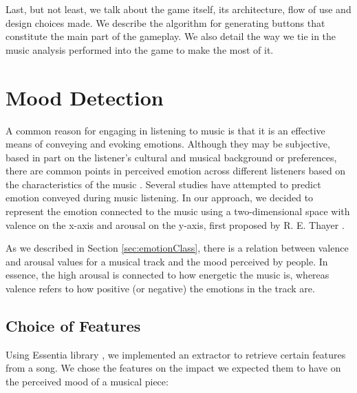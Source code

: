 Last, but not least, we talk about the game itself, its architecture, flow of use and design choices made. We describe the algorithm for generating buttons that constitute the main part of the gameplay. We also detail the way we tie in the music analysis performed into the game to make the most of it.

\vspace{20pt}

\section{Mood Detection}

A common reason for engaging in listening to music is that it is an effective means of conveying and evoking emotions. Although they may be subjective, based in part on the listener’s cultural and musical background or preferences, there are common points in perceived emotion across different listeners based on the characteristics of the music \cite{vempala}. Several studies have attempted to predict emotion conveyed during music listening. In our approach, we decided to represent the emotion connected to the music using a two-dimensional space with valence on the x-axis and arousal on the y-axis, first proposed by R. E. Thayer \cite{Thayer}.

As we described in Section \ref{sec:emotionClass}, there is a relation between valence and arousal values for a musical track and the mood perceived by people. In essence, the high arousal is connected to how energetic the music is, whereas valence refers to how positive (or negative) the emotions in the track are. 

\vspace{10pt}

\subsection{Choice of Features}
Using Essentia library \cite{essentia}, we implemented an extractor to retrieve certain features from a song. We chose the features on the impact we expected them to have on the perceived mood of a musical piece:

